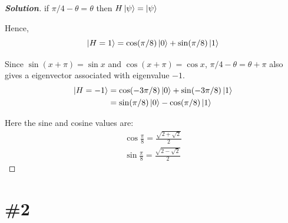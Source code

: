 \documentclass[a4paper,11pt]{article}
\newenvironment{solution}[1]
  {\renewcommand\qedsymbol{$\square$}\begin{proof}[\textbf{Solution#1}]}
  {\end{proof}}
\begin{document}
\begin{solution}{}
    if $\pi/4 - \theta = \theta$ then $H\ket\psi = \ket\psi$

    Hence, 
    \begin{equation}
        \ket{H=1} = \cos(\pi/8)\ket{0} + \sin(\pi/8)\ket{1}
    \end{equation}

    Since $\sin(x + \pi) = \sin x$ and $\cos(x + \pi) = \cos x$, $\pi/4 - \theta = \theta + \pi$ also gives a eigenvector associated with eigenvalue $-1$. 
    \begin{align}
        \ket{H=-1} &= \cos(-3\pi/8)\ket{0} + \sin(-3\pi/8)\ket{1} \\
         &= \sin(\pi/8)\ket{0} - \cos(\pi/8)\ket{1} 
    \end{align}

    Here the sine and cosine values are:
    \begin{gather*}
        \cos\frac{\pi}{8} = \frac{\sqrt{2 + \sqrt{2}}}{2}\\
        \sin\frac{\pi}{8} = \frac{\sqrt{2 - \sqrt{2}}}{2}
    \end{gather*}
\end{solution}

\section{\#2}
\end{document}

